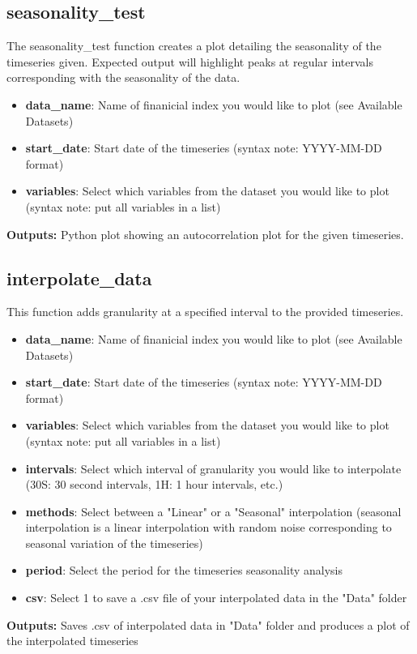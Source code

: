 \documentclass{article}
\begin{document}
\subsection*{seasonality\_test}
The seasonality\_test function creates a plot detailing the seasonality of the timeseries given. Expected output will highlight peaks at regular intervals corresponding with the seasonality of the data. 
\begin{itemize}
    \item \textbf{data\_name}: Name of finanicial index you would like to plot (see Available Datasets) 
    \item \textbf{start\_date}: Start date of the timeseries (syntax note:  YYYY-MM-DD format)
    \item \textbf{variables}: Select which variables from the dataset you would like to plot (syntax note: put all variables in a list)
\end{itemize}
\textbf{Outputs:} Python plot showing an autocorrelation plot for the given timeseries. 


\subsection*{interpolate\_data}
This function adds granularity at a specified interval to the provided timeseries.  

\begin{itemize}
    \item \textbf{data\_name}: Name of finanicial index you would like to plot (see Available Datasets) 
    \item \textbf{start\_date}: Start date of the timeseries (syntax note:  YYYY-MM-DD format)
    \item \textbf{variables}: Select which variables from the dataset you would like to plot (syntax note: put all variables in a list)
    \item \textbf{intervals}: Select which interval of granularity you would like to interpolate (30S: 30 second intervals, 1H: 1 hour intervals, etc.)
    \item \textbf{methods}: Select between a "Linear" or a "Seasonal" interpolation (seasonal interpolation is a linear interpolation with random noise corresponding to seasonal variation of the timeseries)
    \item \textbf{period}: Select the period for the timeseries seasonality analysis
    \item \textbf{csv}: Select 1 to save a .csv file of your interpolated data in the "Data" folder
\end{itemize}
\textbf{Outputs:} Saves .csv of interpolated data in "Data" folder and produces a plot of the interpolated timeseries
\end{document}
